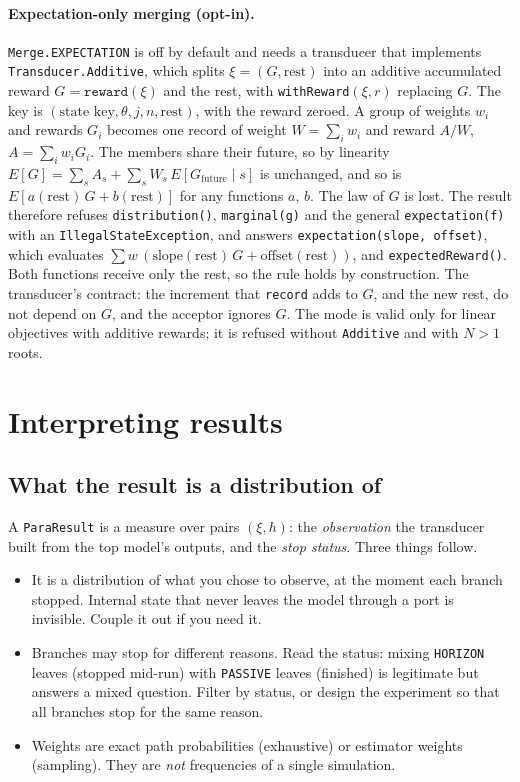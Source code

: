 \documentclass[11pt]{article}
\newcommand{\code}[1]{\texttt{#1}}
\begin{document}
\paragraph{Expectation-only merging (opt-in).} \code{Merge.EXPECTATION} is off by default and needs a transducer that
implements \code{Transducer.Additive}, which splits $\xi=(G,\text{rest})$ into an additive accumulated reward
$G=\code{reward}(\xi)$ and the rest, with \code{withReward}$(\xi,r)$ replacing $G$. The key is
$(\text{state key}, \theta, j, n, \text{rest})$, with the reward zeroed. A group of weights $w_i$ and rewards $G_i$ becomes one
record of weight $W=\sum_i w_i$ and reward $A/W$, $A=\sum_i w_i G_i$. The members share their future, so by linearity
$E[G]=\sum_s A_s+\sum_s W_s\,E[G_{\text{future}}\mid s]$ is unchanged, and so is $E[a(\text{rest})\,G+b(\text{rest})]$ for
any functions $a$, $b$. The law of $G$ is lost. The result therefore refuses \code{distribution()}, \code{marginal(g)} and
the general \code{expectation(f)} with an \code{IllegalStateException}, and answers \code{expectation(slope, offset)}, which
evaluates $\sum w\,(\text{slope}(\text{rest})\,G+\text{offset}(\text{rest}))$, and \code{expectedReward()}. Both functions
receive only the rest, so the rule holds by construction. The transducer's contract: the increment that \code{record} adds
to $G$, and the new rest, do not depend on $G$, and the acceptor ignores $G$. The mode is valid only for linear objectives
with additive rewards; it is refused without \code{Additive} and with $N>1$ roots.

\section{Interpreting results}

\subsection{What the result is a distribution of}
A \code{ParaResult} is a measure over pairs $(\xi, h)$: the \emph{observation} the transducer built from the top
model's outputs, and the \emph{stop status}. Three things follow.
\begin{itemize}
\item It is a distribution of what you chose to observe, at the moment each branch stopped. Internal state that never
  leaves the model through a port is invisible. Couple it out if you need it.
\item Branches may stop for different reasons. Read the status: mixing \code{HORIZON} leaves (stopped mid-run) with
  \code{PASSIVE} leaves (finished) is legitimate but answers a mixed question. Filter by status, or design the
  experiment so that all branches stop for the same reason.
\item Weights are exact path probabilities (exhaustive) or estimator weights (sampling). They are \emph{not}
  frequencies of a single simulation.
\end{itemize}
\end{document}
